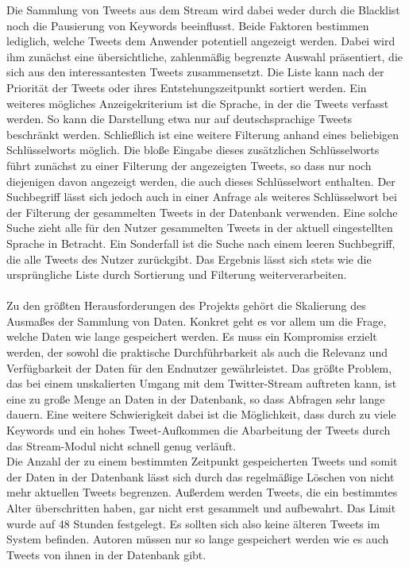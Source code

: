 Die Sammlung von Tweets aus dem Stream wird dabei weder durch die Blacklist noch die Pausierung von Keywords beeinflusst. Beide Faktoren bestimmen lediglich, welche Tweets dem Anwender potentiell angezeigt werden. Dabei wird ihm zunächst eine übersichtliche, zahlenmäßig begrenzte Auswahl präsentiert, die sich aus den interessantesten Tweets zusammensetzt. Die Liste kann nach der Priorität der Tweets oder ihres Entstehungszeitpunkt sortiert werden. Ein weiteres mögliches Anzeigekriterium ist die Sprache, in der die Tweets verfasst werden. So kann die Darstellung etwa nur auf deutschsprachige Tweets beschränkt werden. Schließlich ist eine weitere Filterung anhand eines beliebigen Schlüsselworts möglich. Die bloße Eingabe dieses zusätzlichen Schlüsselworts führt zunächst zu einer Filterung der angezeigten Tweets, so dass nur noch diejenigen davon angezeigt werden, die auch dieses Schlüsselwort enthalten. Der Suchbegriff lässt sich jedoch auch in einer Anfrage als weiteres Schlüsselwort bei der Filterung der gesammelten Tweets in der Datenbank verwenden. Eine solche Suche zieht alle für den Nutzer gesammelten Tweets in der aktuell eingestellten Sprache in Betracht. Ein Sonderfall ist die Suche nach einem leeren Suchbegriff, die alle Tweets des Nutzer zurückgibt. Das Ergebnis lässt sich stets wie die ursprüngliche Liste durch Sortierung und Filterung weiterverarbeiten.
\\\\ %
Zu den größten Herausforderungen des Projekts gehört die Skalierung des Ausmaßes der Sammlung von Daten. Konkret geht es vor allem um die Frage, welche Daten wie lange gespeichert werden. Es muss ein Kompromiss erzielt werden, der sowohl die praktische Durchführbarkeit als auch die Relevanz und Verfügbarkeit der Daten für den Endnutzer gewährleistet. Das größte Problem, das bei einem unskalierten Umgang mit dem Twitter-Stream auftreten kann, ist eine zu große Menge an Daten in der Datenbank, so dass Abfragen sehr lange dauern. Eine weitere Schwierigkeit dabei ist die Möglichkeit, dass durch zu viele Keywords und ein hohes Tweet-Aufkommen die Abarbeitung der Tweets durch das Stream-Modul nicht schnell genug verläuft. \\
Die Anzahl der zu einem bestimmten Zeitpunkt gespeicherten Tweets und somit der Daten in der Datenbank lässt sich durch das regelmäßige Löschen von nicht mehr aktuellen Tweets begrenzen. Außerdem werden Tweets, die ein bestimmtes Alter überschritten haben, gar nicht erst gesammelt und aufbewahrt. Das Limit wurde auf 48 Stunden festgelegt. Es sollten sich also keine älteren Tweets im System befinden. Autoren müssen nur so lange gespeichert werden wie es auch Tweets von ihnen in der Datenbank gibt. \\
